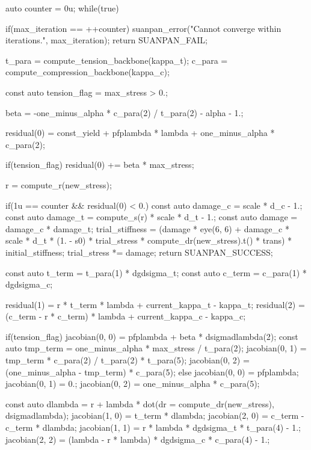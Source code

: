 \begin{cppcode}
{    auto counter = 0u;
    while(true) {
        if(max_iteration == ++counter) {
            suanpan_error("Cannot converge within {} iterations.\n", max_iteration);
            return SUANPAN_FAIL;
        }

        t_para = compute_tension_backbone(kappa_t);
        c_para = compute_compression_backbone(kappa_c);

        const auto tension_flag = max_stress > 0.;

        beta = -one_minus_alpha * c_para(2) / t_para(2) - alpha - 1.;

        residual(0) = const_yield + pfplambda * lambda + one_minus_alpha * c_para(2);

        if(tension_flag) residual(0) += beta * max_stress;

        r = compute_r(new_stress);

        if(1u == counter && residual(0) < 0.) {
            const auto damage_c = scale * d_c - 1.;
            const auto damage_t = compute_s(r) * scale * d_t - 1.;
            const auto damage = damage_c * damage_t;
            trial_stiffness = (damage * eye(6, 6) + damage_c * scale * d_t * (1. - s0) * trial_stress * compute_dr(new_stress).t() * trans) * initial_stiffness;
            trial_stress *= damage;
            return SUANPAN_SUCCESS;
        }

        const auto t_term = t_para(1) * dgdsigma_t;
        const auto c_term = c_para(1) * dgdsigma_c;

        residual(1) = r * t_term * lambda + current_kappa_t - kappa_t;
        residual(2) = (c_term - r * c_term) * lambda + current_kappa_c - kappa_c;

        if(tension_flag) {
            jacobian(0, 0) = pfplambda + beta * dsigmadlambda(2);
            const auto tmp_term = one_minus_alpha * max_stress / t_para(2);
            jacobian(0, 1) = tmp_term * c_para(2) / t_para(2) * t_para(5);
            jacobian(0, 2) = (one_minus_alpha - tmp_term) * c_para(5);
        }
        else {
            jacobian(0, 0) = pfplambda;
            jacobian(0, 1) = 0.;
            jacobian(0, 2) = one_minus_alpha * c_para(5);
        }

        const auto dlambda = r + lambda * dot(dr = compute_dr(new_stress), dsigmadlambda);
        jacobian(1, 0) = t_term * dlambda;
        jacobian(2, 0) = c_term - c_term * dlambda;
        jacobian(1, 1) = r * lambda * dgdsigma_t * t_para(4) - 1.;
        jacobian(2, 2) = (lambda - r * lambda) * dgdsigma_c * c_para(4) - 1.;

}}
\end{cppcode}
